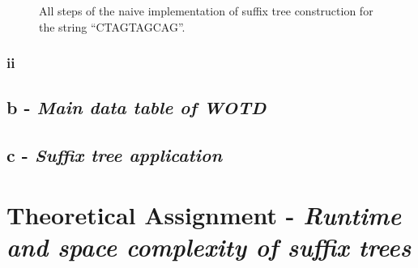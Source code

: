 \documentclass[%
   10pt,              %
   ngerman,           %
   a4paper,           %
   DIV11,             %
]{scrartcl}%
\begin{document}
\begin{figure}[ht]
{ }
 \caption{All steps of the naive implementation of suffix tree construction for the string ``CTAGTAGCAG''.}
 \label{fig:naiveImpl}
\end{figure}

\subsubsection*{ii}


\subsection*{b - \textit{Main data table of WOTD}}


\subsection*{c - \textit{Suffix tree application}}



\section*{Theoretical Assignment - \textit{Runtime and space complexity of suffix trees}}
\end{document}
